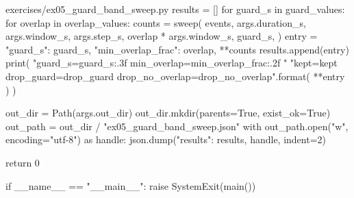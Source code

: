 \documentclass[11pt,openany]{book}
\begin{document}
\begin{filecontents*}{exercises/ex05_guard_band_sweep.py}
    results = []
    for guard_s in guard_values:
        for overlap in overlap_values:
            counts = sweep(
                events,
                args.duration_s,
                args.window_s,
                args.step_s,
                overlap * args.window_s,
                guard_s,
            )
            entry = {"guard_s": guard_s, "min_overlap_frac": overlap, **counts}
            results.append(entry)
            print(
                "guard_s={guard_s:.3f} min_overlap={min_overlap_frac:.2f} "
                "kept={kept} drop_guard={drop_guard} drop_no_overlap={drop_no_overlap}".format(
                    **entry
                )
            )

    out_dir = Path(args.out_dir)
    out_dir.mkdir(parents=True, exist_ok=True)
    out_path = out_dir / "ex05_guard_band_sweep.json"
    with out_path.open("w", encoding="utf-8") as handle:
        json.dump({"results": results}, handle, indent=2)

    return 0


if __name__ == "__main__":
    raise SystemExit(main())
\end{filecontents*}
\end{document}
